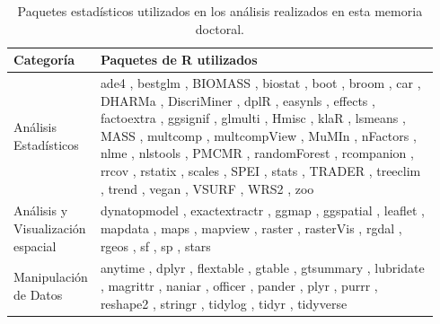 \begin{table}
\caption{Paquetes estadísticos utilizados en los análisis realizados en esta memoria doctoral.}\label{tab:metodos:paquetes}
\centering
\scriptsize
\begin{tabular}{>{\RaggedRight}m{0.14\linewidth}>{\RaggedRight}m{0.8\linewidth}}
\textbf{Categoría} & \textbf{Paquetes de R utilizados} \\
\toprule
Análisis Estadísticos & ade4 \autocite{ade4}, bestglm \autocite{bestglm}, BIOMASS \autocite{BIOMASS}, biostat \autocite{biostat}, boot \autocite{boot}, broom \autocite{broom}, car \autocite{car}, DHARMa \autocite{DHARMa}, DiscriMiner \autocite{DiscriMiner}, dplR \autocite{dplR}, easynls \autocite{easynls}, effects \autocite{effects}, factoextra \autocite{factoextra}, ggsignif \autocite{ggsignif}, glmulti \autocite{glmulti}, Hmisc \autocite{Hmisc}, klaR \autocite{klaR}, lsmeans \autocite{lsmeans}, MASS \autocite{MASS}, multcomp \autocite{multcomp}, multcompView \autocite{multcompView}, MuMIn \autocite{MuMIn}, nFactors \autocite{nFactors}, nlme \autocite{nlme}, nlstools \autocite{nlstools}, PMCMR \autocite{PMCMR}, randomForest \autocite{randomForest}, rcompanion \autocite{rcompanion}, rrcov \autocite{rrcov}, rstatix \autocite{rstatix}, scales \autocite{scales}, SPEI \autocite{SPEI}, stats \autocite{stats}, TRADER \autocite{TRADER}, treeclim \autocite{ZangBiondi2015TreeclimPackage}, trend \autocite{trend}, vegan \autocite{vegan}, VSURF \autocite{VSURF}, WRS2 \autocite{WRS2}, zoo \autocite{zoo} \\ \midrule
Análisis y Visualización espacial & dynatopmodel \autocite{dynatopmodel}, exactextractr \autocite{exactextractr}, ggmap \autocite{ggmap}, ggspatial \autocite{ggspatial}, leaflet \autocite{leaflet}, mapdata \autocite{mapdata}, maps \autocite{maps}, mapview \autocite{mapview}, raster \autocite{raster}, rasterVis \autocite{rasterVis}, rgdal \autocite{rgdal}, rgeos \autocite{rgeos}, sf \autocite{sf}, sp \autocite{sp}, stars \autocite{stars} \\ \midrule
Manipulación de Datos & anytime \autocite{anytime}, dplyr \autocite{dplyr}, flextable \autocite{flextable}, gtable \autocite{gtable}, gtsummary \autocite{gtsummary}, lubridate \autocite{lubridate}, magrittr \autocite{magrittr}, naniar \autocite{naniar}, officer \autocite{officer}, pander \autocite{pander}, plyr \autocite{plyr}, purrr \autocite{purrr}, reshape2 \autocite{reshape2}, stringr \autocite{stringr}, tidylog \autocite{tidylog}, tidyr \autocite{tidyr}, tidyverse \autocite{tidyverse} \\ \midrule

\end{tabular}
\end{table}

